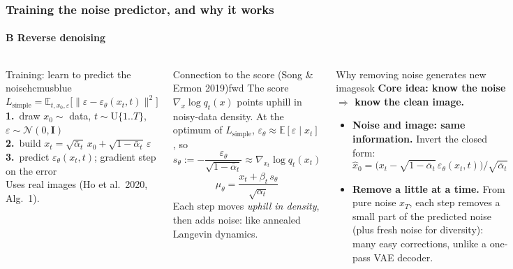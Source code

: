 \documentclass[aspectratio=169,9pt,xcolor=table]{beamer}
\newcommand{\E}{\mathbb{E}}
\newcommand{\Normal}{\mathcal{N}}
\newcommand{\Id}{\mathbf{I}}
\newcommand{\eps}{\varepsilon}
\newcommand{\ab}{\bar{\alpha}}
\begin{document}
\begin{frame}
\frametitle{Training the noise predictor, and why it works}
\framesubtitle{B \textperiodcentered{} Reverse denoising}
\begin{columns}[T,onlytextwidth]
\begin{tbox}[fontupper=\footnotesize]{Training: learn to predict the noise}{hcmusblue}
\setlength{\abovedisplayskip}{1pt}\setlength{\belowdisplayskip}{2pt}
\[L_{\text{simple}}=\E_{t,x_0,\eps}\big[\|\eps-\eps_\theta(x_t,t)\|^2\big]\]
\textbf{1.}~draw $x_0\sim$ data, $t\sim\mathrm{U}\{1..T\}$, $\eps\sim\Normal(0,\Id)$\\
\textbf{2.}~build $x_t=\sqrt{\ab_t}\,x_0+\sqrt{1-\ab_t}\,\eps$\\
\textbf{3.}~predict $\eps_\theta(x_t,t)$; gradient step on the error\\[0.5mm]
{\scriptsize\color{muted}Uses real images (Ho et al.\ 2020, Alg.~1).}
\end{tbox}
\begin{tbox}[fontupper=\footnotesize,after skip=0pt]{Connection to the score (Song \& Ermon 2019)}{fwd}
\setlength{\abovedisplayskip}{1pt}\setlength{\belowdisplayskip}{1pt}
The score $\nabla_x\log q_t(x)$ points uphill in noisy-data density. At the optimum of $L_{\text{simple}}$, \mbox{$\eps_\theta\approx\E[\eps\mid x_t]$}, so
\[s_\theta:=-\frac{\eps_\theta}{\sqrt{1-\ab_t}}\approx\nabla_{x_t}\log q_t(x_t)\]
\[\mu_\theta=\frac{x_t+\beta_t\,s_\theta}{\sqrt{\alpha_t}}\]
Each step moves \emph{uphill in density}, then adds noise: like annealed Langevin dynamics.
\end{tbox}
\begin{tbox}[fontupper=\footnotesize,before skip=0pt,after skip=0pt]{Why removing noise generates new images}{ok}
\setlength{\abovedisplayskip}{1pt}\setlength{\belowdisplayskip}{1pt}
\textbf{Core idea: know the noise $\Rightarrow$ know the clean image.}
\begin{itemize}\setlength{\itemsep}{2.2pt}
\item \textbf{Noise and image: same information.} Invert the closed form:
\[\hat x_0=\big(x_t-\sqrt{1-\ab_t}\,\eps_\theta(x_t,t)\big)/\sqrt{\ab_t}\]
\item \textbf{Remove a little at a time.} From pure noise $x_T$, each step removes a small part of the predicted noise (plus fresh noise for diversity): many easy corrections, unlike a one-pass VAE decoder.

\end{itemize}
\end{tbox}
\end{columns}
\end{frame}
\end{document}
